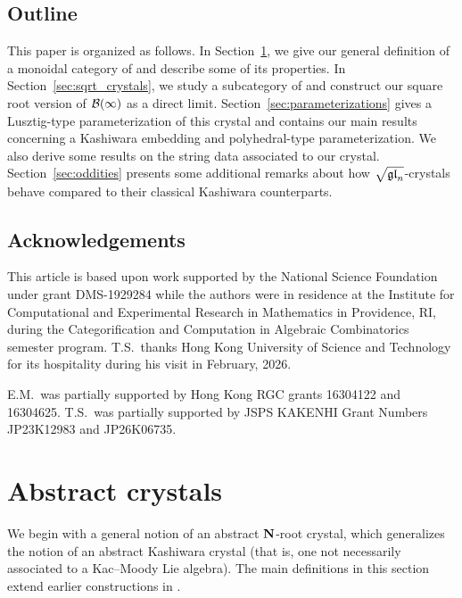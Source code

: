 \documentclass[11pt]{article}
\begin{document}
\subsection{Outline}
This paper is organized as follows.
In Section~\ref{sec:abstract}, we give our general definition of a monoidal category of  and describe some of its properties.
In Section~\ref{sec:sqrt_crystals}, we study a subcategory of  and construct our square root version of $\mathcal{B}(\infty)$ as a direct limit. %
Section~\ref{sec:parameterizations} gives a Lusztig-type parameterization of this crystal and contains our main results concerning a Kashiwara embedding and polyhedral-type parameterization. 
We also derive some results on the string data associated to our crystal.
Section~\ref{sec:oddities} presents some additional remarks about how $\sqrt{\mathfrak{gl}_n}$-crystals behave compared to their classical Kashiwara counterparts. 



\subsection*{Acknowledgements}

This article is based upon work supported by the National Science Foundation under grant DMS-1929284 while the authors were in residence at the Institute for Computational and Experimental Research in Mathematics in Providence, RI, during the Categorification and Computation in Algebraic Combinatorics semester program.
T.S.\ thanks Hong Kong University of Science and Technology for its hospitality during his visit in February, 2026.

E.M.\ was partially supported by Hong Kong RGC grants 16304122 and 16304625. 
T.S.\ was partially supported by JSPS KAKENHI Grant Numbers JP23K12983 and JP26K06735.




\section{Abstract crystals}
\label{sec:abstract}

We begin with a general notion of an abstract $\mathbf{N}$-root crystal, which generalizes the notion of an abstract Kashiwara crystal (that is, one not necessarily associated to a Kac--Moody Lie algebra).
The main definitions in this section extend earlier constructions in \cite{MT2023,MTY,Yu23}.
\end{document}
